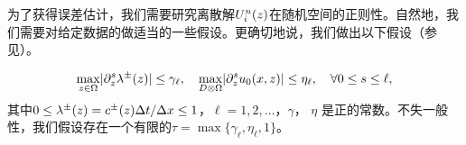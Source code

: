 为了获得误差估计，我们需要研究离散解$U^n_i(z)$在随机空间的正则性。自然地，我们需要对给定数据的做适当的一些假设。更确切地说，我们做出以下假设（参见）。
\begin{assu}\label{assu}
  \begin{equation}
    \underset{z\in\Omega}{\max}|\partial^{s}_z \lambda^{\pm}(z)|\leq\gamma_\ell, \quad\underset{D\otimes\Omega}{\max}|\partial^{s}_z u_0(x,z)|\leq \eta_\ell, \quad \forall 0\leq s\leq\ell,
  \end{equation}
  其中$0\leq\lambda^{\pm}(z)=c^{\pm}(z)\Delta t/\Delta x\leq 1$，$\ell = 1, 2, \dotsc$，$\gamma$， $\eta$ 是正的常数。不失一般性，我们假设存在一个有限的$\tau = \max\big\{\gamma_\ell, \eta_\ell, 1\big\}$。
\end{assu}

